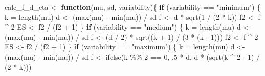 \documentclass[
]{book}
\newenvironment{Shaded}{\begin{snugshade}}{\end{snugshade}}
\newcommand{\ControlFlowTok}[1]{\textcolor[rgb]{0.13,0.29,0.53}{\textbf{#1}}}
\newcommand{\DecValTok}[1]{\textcolor[rgb]{0.00,0.00,0.81}{#1}}
\newcommand{\FunctionTok}[1]{\textcolor[rgb]{0.00,0.00,0.00}{#1}}
\newcommand{\NormalTok}[1]{#1}
\newcommand{\OtherTok}[1]{\textcolor[rgb]{0.56,0.35,0.01}{#1}}
\newcommand{\SpecialCharTok}[1]{\textcolor[rgb]{0.00,0.00,0.00}{#1}}
\newcommand{\StringTok}[1]{\textcolor[rgb]{0.31,0.60,0.02}{#1}}
\begin{document}
\begin{Shaded}
\begin{Highlighting}[]
\NormalTok{calc\_f\_d\_eta }\OtherTok{\textless{}{-}} \ControlFlowTok{function}\NormalTok{(mu, sd, variability)\{}
  \ControlFlowTok{if}\NormalTok{ (variability }\SpecialCharTok{==} \StringTok{"minimum"}\NormalTok{) \{}
\NormalTok{    k }\OtherTok{=} \FunctionTok{length}\NormalTok{(mu)}
\NormalTok{    d }\OtherTok{\textless{}{-}}\NormalTok{ (}\FunctionTok{max}\NormalTok{(mu) }\SpecialCharTok{{-}} \FunctionTok{min}\NormalTok{(mu)) }\SpecialCharTok{/}\NormalTok{ sd}
\NormalTok{    f }\OtherTok{\textless{}{-}}\NormalTok{ d }\SpecialCharTok{*} \FunctionTok{sqrt}\NormalTok{(}\DecValTok{1} \SpecialCharTok{/}\NormalTok{ (}\DecValTok{2} \SpecialCharTok{*}\NormalTok{ k))}
\NormalTok{    f2 }\OtherTok{\textless{}{-}}\NormalTok{ f }\SpecialCharTok{\^{}} \DecValTok{2}
\NormalTok{    ES }\OtherTok{\textless{}{-}}\NormalTok{ f2 }\SpecialCharTok{/}\NormalTok{ (f2 }\SpecialCharTok{+} \DecValTok{1}\NormalTok{)}
\NormalTok{  \}}
  \ControlFlowTok{if}\NormalTok{ (variability }\SpecialCharTok{==} \StringTok{"medium"}\NormalTok{) \{}
\NormalTok{    k }\OtherTok{=} \FunctionTok{length}\NormalTok{(mu)}
\NormalTok{    d }\OtherTok{\textless{}{-}}\NormalTok{ (}\FunctionTok{max}\NormalTok{(mu) }\SpecialCharTok{{-}} \FunctionTok{min}\NormalTok{(mu)) }\SpecialCharTok{/}\NormalTok{ sd}
\NormalTok{    f }\OtherTok{\textless{}{-}}\NormalTok{ (d }\SpecialCharTok{/} \DecValTok{2}\NormalTok{) }\SpecialCharTok{*} \FunctionTok{sqrt}\NormalTok{((k }\SpecialCharTok{+} \DecValTok{1}\NormalTok{) }\SpecialCharTok{/}\NormalTok{ (}\DecValTok{3} \SpecialCharTok{*}\NormalTok{ (k }\SpecialCharTok{{-}} \DecValTok{1}\NormalTok{)))}
\NormalTok{    f2 }\OtherTok{\textless{}{-}}\NormalTok{ f }\SpecialCharTok{\^{}} \DecValTok{2}
\NormalTok{    ES }\OtherTok{\textless{}{-}}\NormalTok{ f2 }\SpecialCharTok{/}\NormalTok{ (f2 }\SpecialCharTok{+} \DecValTok{1}\NormalTok{)}
\NormalTok{  \}}
  \ControlFlowTok{if}\NormalTok{ (variability }\SpecialCharTok{==} \StringTok{"maximum"}\NormalTok{) \{}
\NormalTok{    k }\OtherTok{=} \FunctionTok{length}\NormalTok{(mu)}
\NormalTok{    d }\OtherTok{\textless{}{-}}\NormalTok{ (}\FunctionTok{max}\NormalTok{(mu) }\SpecialCharTok{{-}} \FunctionTok{min}\NormalTok{(mu)) }\SpecialCharTok{/}\NormalTok{ sd}
\NormalTok{    f }\OtherTok{\textless{}{-}} \FunctionTok{ifelse}\NormalTok{(k }\SpecialCharTok{\%\%} \DecValTok{2} \SpecialCharTok{==} \DecValTok{0}\NormalTok{, .}\DecValTok{5} \SpecialCharTok{*}\NormalTok{ d, d }\SpecialCharTok{*}\NormalTok{ (}\FunctionTok{sqrt}\NormalTok{(k }\SpecialCharTok{\^{}} \DecValTok{2} \SpecialCharTok{{-}} \DecValTok{1}\NormalTok{) }\SpecialCharTok{/}\NormalTok{ (}\DecValTok{2} \SpecialCharTok{*}\NormalTok{ k)))}

\end{Highlighting}
\end{Shaded}
\end{document}

